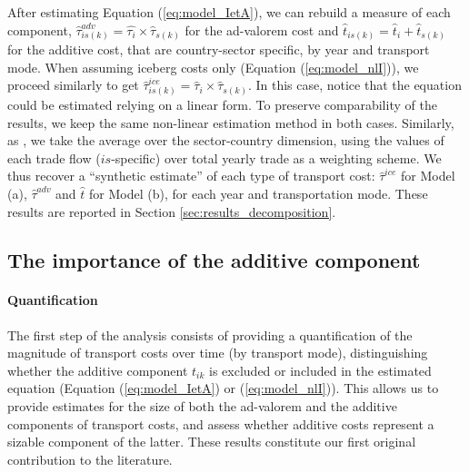 \documentclass[a4paper,11pt]{article}
\begin{document}


After estimating Equation (\ref{eq:model_IetA}), we can rebuild a measure of each component, $\widehat{\tau}^{adv}_{is(k)} = \widehat{\tau_{i}} \times \widehat{\tau}_{s(k)}$ for the ad-valorem cost and $\widehat{t}_{is(k)} = \widehat{t}_{i} + \widehat{t}_{s(k)}$ for the additive cost, that are country-sector specific, by year and transport mode.
When assuming iceberg costs only (Equation (\ref{eq:model_nlI})), we proceed similarly to get $\widehat{\tau}^{ice}_{is(k)} = \widehat{\tau}_{i} \times \widehat{\tau}_{s(k)}$.
In this case, notice that the equation could be estimated relying on a linear form.
To preserve comparability of the results, we keep the same non-linear estimation method in both cases.
Similarly, as \cite{Irrazabal_2015}, we take the average over the sector-country dimension, using the values of each trade flow ($is$-specific) over total yearly trade as a weighting scheme.
We thus recover a ``synthetic estimate'' of each type of transport cost: $\widehat{\tau}^{ice}$ for Model (a), $\widehat{\tau}^{adv}$ and $\widehat{t}$ for Model (b), for each year and transportation mode.
These results are reported in Section \ref{sec:results_decomposition}.


\subsection{The importance of the additive component \label{sec:results_decomposition}}

\paragraph{Quantification} The first step of the analysis consists of providing a quantification of the magnitude of transport costs over time (by transport mode), distinguishing whether the additive component $t_{ik}$ is excluded or included in the estimated equation (Equation (\ref{eq:model_IetA}) or (\ref{eq:model_nlI})).
This allows us to provide estimates for the size of both the ad-valorem and the additive components of transport costs, and assess whether additive costs represent a sizable component of the latter.
These results constitute our first original contribution to the literature.
\smallskip
\end{document}
